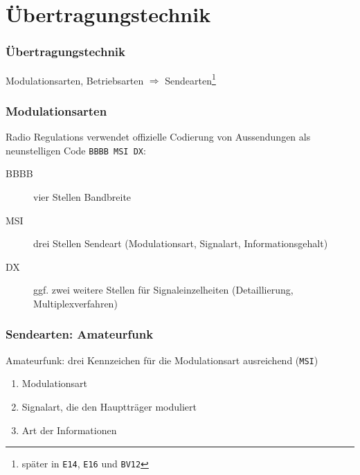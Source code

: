 \section[Übertra\-gungs\-technik]{Übertragungstechnik}

\begin{frame}
    \frametitle{Übertragungstechnik}
        
    \begin{center}
        Modulationsarten, Betriebsarten $\Rightarrow$ Sendearten\footnote{später
        in \texttt{E14}, \texttt{E16} und \texttt{BV12}}
    \end{center}

\end{frame}

\begin{frame}
    \frametitle{Modulationsarten}

    Radio Regulations verwendet offizielle Codierung von Aussendungen als
    neunstelligen Code \texttt{BBBB\,MSI\,DX}: \\[2em]

    \begin{description}
        \item[BBBB] vier Stellen Bandbreite
        \item[MSI] drei Stellen Sendeart (Modulationsart, Signalart,
                   Informationsgehalt)
        \item[DX] ggf. zwei weitere Stellen für Signaleinzelheiten
                  (Detaillierung, Multiplexverfahren)
    \end{description}

\end{frame}

\begin{frame}
    \frametitle{Sendearten: Amateurfunk}

    Amateurfunk: drei Kennzeichen für die Modulationsart ausreichend (\texttt{MSI})

    \begin{enumerate}
        \item Modulationsart
        \item Signalart, die den Hauptträger moduliert
        \item Art der Informationen
    \end{enumerate}


\end{frame}

